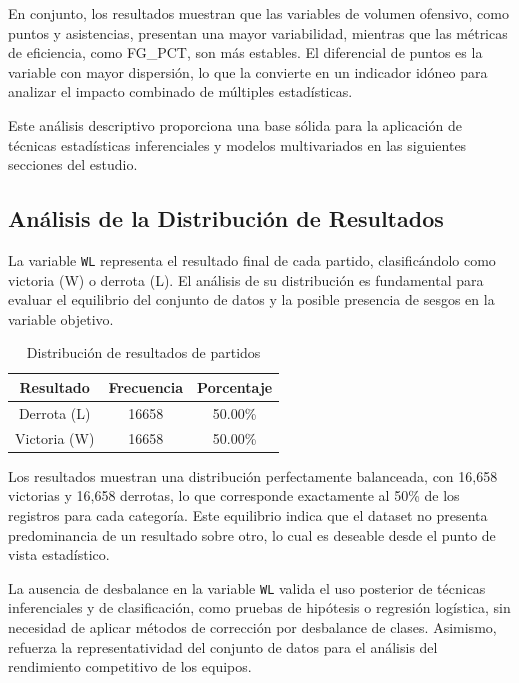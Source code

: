 \documentclass[12pt]{article}
\begin{document}
En conjunto, los resultados muestran que las variables de volumen ofensivo, como puntos y
asistencias, presentan una mayor variabilidad, mientras que las métricas de eficiencia, como
FG\_PCT, son más estables. El diferencial de puntos es la variable con mayor dispersión, lo que la
convierte en un indicador idóneo para analizar el impacto combinado de múltiples estadísticas.

Este análisis descriptivo proporciona una base sólida para la aplicación de técnicas estadísticas
inferenciales y modelos multivariados en las siguientes secciones del estudio.

\subsection*{Análisis de la Distribución de Resultados}

La variable \texttt{WL} representa el resultado final de cada partido, clasificándolo como
victoria (W) o derrota (L). El análisis de su distribución es fundamental para evaluar el
equilibrio del conjunto de datos y la posible presencia de sesgos en la variable objetivo.

\begin{table}[H]
\centering
\caption{Distribución de resultados de partidos}
\label{tab:distribucion_wl}
\begin{tabular}{|c|c|c|}
\hline
\textbf{Resultado} & \textbf{Frecuencia} & \textbf{Porcentaje} \\
\hline
Derrota (L) & 16658 & 50.00\% \\
Victoria (W) & 16658 & 50.00\% \\
\hline
\end{tabular}
\end{table}

Los resultados muestran una distribución perfectamente balanceada, con 16,658 victorias
y 16,658 derrotas, lo que corresponde exactamente al 50\% de los registros para cada
categoría. Este equilibrio indica que el dataset no presenta predominancia de un resultado
sobre otro, lo cual es deseable desde el punto de vista estadístico.

La ausencia de desbalance en la variable \texttt{WL} valida el uso posterior de técnicas
inferenciales y de clasificación, como pruebas de hipótesis o regresión logística, sin
necesidad de aplicar métodos de corrección por desbalance de clases. Asimismo, refuerza la
representatividad del conjunto de datos para el análisis del rendimiento competitivo de
los equipos.
\end{document}
